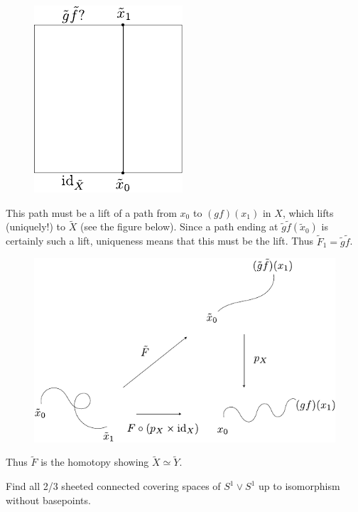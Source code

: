 \documentclass[twoside,10pt]{article}
\begin{document}
\begin{figure}[H]
	\centering
	\includegraphics[scale=1]{fig/8.pdf}
\end{figure}

This path must be a lift of a path from $x_0$ to $(gf)(x_1)$ in $X$, which lifts (uniquely!) to $\tilde{X}$ (see the figure below). Since a path ending at $\tilde{g}\tilde{f}(\tilde{x}_0)$ is certainly such a lift, uniqueness means that this must be the lift. Thus $\tilde{F}_1 = \tilde{g} \tilde{f}$.

\begin{figure}[H]
	\centering
	\includegraphics[scale=1]{fig/8b.pdf}
\end{figure}

Thus $\tilde{F}$ is the homotopy showing $\tilde{X} \simeq \tilde{Y}$.

\newpage

\begin{exer}[1.3: 10]
Find all 2/3 sheeted connected covering spaces of $S^{1}\vee S^{1}$ up to isomorphism without basepoints.
\end{exer}
\end{document}
